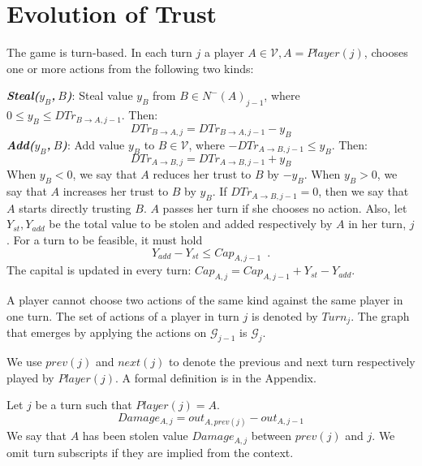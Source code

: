 \documentclass[11pt]{llncs}
\theoremstyle{definition}
\begin{document}
   \section{Evolution of Trust}
     \begin{definition}[Turns]
        The game is turn-based. In each turn $j$ a player $A \in \mathcal{V}, A =
        Player\left(j\right)$, chooses one or more actions from the following two kinds:

        \noindent \textit{\textbf{Steal($y_B$,$\:B$)}}: Steal value $y_B$ from $B \in N^{-}\left(A\right)_{j-1}$, where
        $0 \leq y_B \leq DTr_{B \rightarrow A, j-1}$. Then:
        \begin{equation*}
           DTr_{B \rightarrow A, j} = DTr_{B \rightarrow A, j-1} - y_B
        \end{equation*}
        \noindent \textit{\textbf{Add($y_B$,$\:B$)}}:
        Add value $y_B$ to $B \in \mathcal{V}$, where $-DTr_{A \rightarrow B, j-1} \leq y_B$. Then:
        \begin{equation*}
           DTr_{A \rightarrow B, j} = DTr_{A \rightarrow B, j-1} + y_B
        \end{equation*}
        When $y_B < 0$, we say that $A$ reduces her trust to $B$ by $-y_B$. When $y_B > 0$, we say that $A$ increases her
        trust to $B$ by $y_B$. If $DTr_{A \rightarrow B, j-1} = 0$, then we say that $A$ starts directly trusting $B$.
        $A$ passes her turn if she chooses no action. Also, let $Y_{st}, Y_{add}$ be the
        total value to be stolen and added respectively by $A$ in her turn, $j$. For a turn to be feasible, it must hold
        \begin{equation}
           Y_{add} - Y_{st} \leq Cap_{A, j-1} \enspace.
        \end{equation}
        The capital is updated in every turn: $Cap_{A, j} = Cap_{A, j-1} + Y_{st} - Y_{add}$.

        A player cannot choose two actions of the same kind against the same player in one turn.
        The set of actions of a player in turn $j$ is denoted by $Turn_j$. The graph that emerges by applying
        the actions on $\mathcal{G}_{j-1}$ is $\mathcal{G}_j$.
     \end{definition}
     We use $prev\left(j\right)$ and $next\left(j\right)$ to denote the previous and next turn respectively played by
     $Player(j)$. A formal definition is in the Appendix.
     \begin{definition}[Damage]
        Let $j$ be a turn such that $Player\left(j\right) = A$.
        \begin{equation}
           Damage_{A, j} = out_{A, prev\left(j\right)} - out_{A, j-1}
        \end{equation}
        We say that $A$ has been stolen value $Damage_{A, j}$ between $prev\left(j\right)$ and $j$. We omit turn subscripts
        if they are implied from the context.
     \end{definition}
\end{document}
